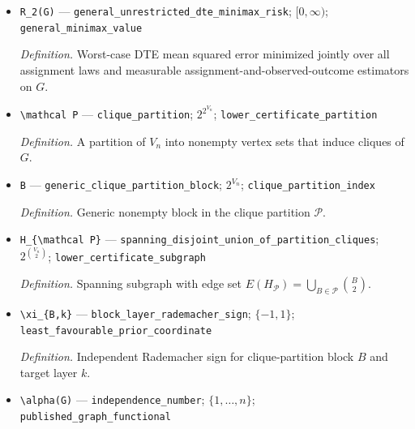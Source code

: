 \documentclass{article}
\begin{document}
\begin{itemize}
  \par\smallskip\noindent\emph{Definition.} Published \(q=2\) arbitrary-neighborhood-interference schedule class on \(G\) with separate target-layer second-moment restrictions.
  \item \texttt{R\_\allowbreak{}2(G)} --- \texttt{general\_\allowbreak{}unrestricted\_\allowbreak{}dte\_\allowbreak{}minimax\_\allowbreak{}risk}; \([0,\infty)\); \texttt{general\_\allowbreak{}minimax\_\allowbreak{}value}
  \par\smallskip\noindent\emph{Definition.} Worst-case DTE mean squared error minimized jointly over all assignment laws and measurable assignment-and-observed-outcome estimators on \(G\).
  \item \texttt{\textbackslash{}\allowbreak{}mathcal P} --- \texttt{clique\_\allowbreak{}partition}; \(2^{2^{V_n}}\); \texttt{lower\_\allowbreak{}certificate\_\allowbreak{}partition}
  \par\smallskip\noindent\emph{Definition.} A partition of \(V_n\) into nonempty vertex sets that induce cliques of \(G\).
  \item \texttt{B} --- \texttt{generic\_\allowbreak{}clique\_\allowbreak{}partition\_\allowbreak{}block}; \(2^{V_n}\); \texttt{clique\_\allowbreak{}partition\_\allowbreak{}index}
  \par\smallskip\noindent\emph{Definition.} Generic nonempty block in the clique partition \(\mathcal P\).
  \item \texttt{H\_\allowbreak{}\{\textbackslash{}\allowbreak{}mathcal P\}\allowbreak{}} --- \texttt{spanning\_\allowbreak{}disjoint\_\allowbreak{}union\_\allowbreak{}of\_\allowbreak{}partition\_\allowbreak{}cliques}; \(2^{\binom{V_n}{2}}\); \texttt{lower\_\allowbreak{}certificate\_\allowbreak{}subgraph}
  \par\smallskip\noindent\emph{Definition.} Spanning subgraph with edge set \(E(H_{\mathcal P})=\bigcup_{B\in\mathcal P}\binom{B}{2}\).
  \item \texttt{\textbackslash{}\allowbreak{}xi\_\allowbreak{}\{B,\allowbreak{}k\}\allowbreak{}} --- \texttt{block\_\allowbreak{}layer\_\allowbreak{}rademacher\_\allowbreak{}sign}; \(\{-1,1\}\); \texttt{least\_\allowbreak{}favourable\_\allowbreak{}prior\_\allowbreak{}coordinate}
  \par\smallskip\noindent\emph{Definition.} Independent Rademacher sign for clique-partition block \(B\) and target layer \(k\).
  \item \texttt{\textbackslash{}\allowbreak{}alpha(G)} --- \texttt{independence\_\allowbreak{}number}; \(\{1,\ldots,n\}\); \texttt{published\_\allowbreak{}graph\_\allowbreak{}functional}

\end{itemize}
\end{document}
